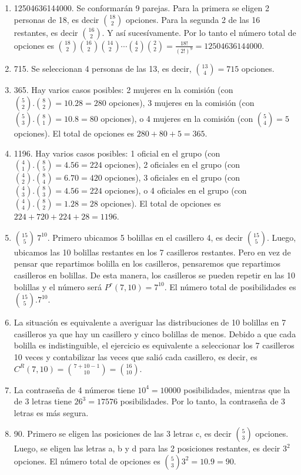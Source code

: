 \documentclass[a4paper]{article}
\begin{document}
\begin{enumerate}
\begin{enumerate} [label=(\alph*)]
		\item 12504636144000. Se conformarán 9 parejas. Para la primera se eligen 2 personas de 18, es decir $\binom{18}{2}$ opciones. Para la segunda 2 de las 16 restantes, es decir $\binom{16}{2}$. Y así sucesívamente. Por lo tanto el número total de opciones es $\binom{18}{2}\binom{16}{2}\binom{14}{2} \cdots \binom{4}{2}\binom{2}{2}=\frac{18!}{(2!)^9}=12504636144000$.
		\item 715. Se seleccionan 4 personas de las 13, es decir, $\binom{13}{4}=715$ opciones.
		\item 365. Hay varios casos posibles: 2 mujeres en la comisión (con $\binom{5}{2}.\binom{8}{2}=10.28=280$ opciones), 3 mujeres en la comisión (con $\binom{5}{3}.\binom{8}{1}=10.8=80$ opciones), o 4 mujeres en la comisión (con $\binom{5}{4}=5$ opciones). El total de opciones es $280+80+5=365$.
		\item 1196. Hay varios casos posibles: 1 oficial en el grupo (con $\binom{4}{1}.\binom{8}{5}=4.56=224$ opciones), 2 oficiales en el grupo (con $\binom{4}{2}.\binom{8}{4}=6.70=420$ opciones), 3 oficiales en el grupo (con $\binom{4}{3}.\binom{8}{3}=4.56=224$ opciones), o 4 oficiales en el grupo (con $\binom{4}{4}.\binom{8}{2}=1.28=28$ opciones). El total de opciones es $224+720+224+28=1196$. %
		\item $\binom{15}{5}~7^{10}$. Primero ubicamos 5 bolillas en el casillero 4, es decir $\binom{15}{5}$. Luego, ubicamos las 10 bolillas restantes en los 7 casilleros restantes. Pero en vez de pensar que repartimos bolilla en los casilleros, pensaremos que repartimos casilleros en bolillas. De esta manera, los casilleros se pueden repetir en las 10 bolillas y el número será $P^r(7,10)=7^{10}$. El número total de posibilidades es $\binom{15}{5}.7^{10}$.
		\item La situación es equivalente a averiguar las distribuciones de 10 bolillas en 7 casilleros ya que hay un casillero y cinco bolillas de menos. Debido a que cada bolilla es indistinguible, el ejercicio es equivalente a seleccionar los 7 casilleros 10 veces y contabilizar las veces que salió cada casillero, es decir, es $C^R(7,10)=\binom{7+10-1}{10}=\binom{16}{10}$.
		\item La contraseña de 4 números tiene $10^4=10000$ posibilidades, mientras que la de 3 letras tiene $26^3=17576$ posibilidades. Por lo tanto, la contraseña de 3 letras es más segura.
		\item 90. Primero se eligen las posiciones de las 3 letras c, es decir $\binom{5}{3}$ opciones. Luego, se eligen las letras a, b y d para las 2 posiciones restantes, es decir $3^{2}$ opciones. El número total de opciones es $\binom{5}{3}3^{2}=10.9=90$.

\end{enumerate}
\end{enumerate}
\end{document}
